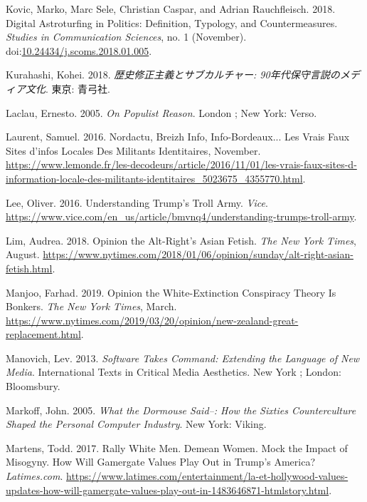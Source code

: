 \documentclass[10pt,british,A4paper,,openany]{memoir}
\begin{document}
\hypertarget{ref-kovic_digital_2018}{}
Kovic, Marko, Marc Sele, Christian Caspar, and Adrian Rauchfleisch.
2018. Digital Astroturfing in Politics: Definition, Typology, and
Countermeasures. \emph{Studies in Communication Sciences}, no. 1
(November).
doi:\href{https://doi.org/10.24434/j.scoms.2018.01.005}{10.24434/j.scoms.2018.01.005}.

\hypertarget{ref-kurahashi_:_2018}{}
Kurahashi, Kohei. 2018. \emph{歴史修正主義とサブカルチャー:
90年代保守言説のメディア文化}. 東京: 青弓社.

\hypertarget{ref-laclau_populist_2005}{}
Laclau, Ernesto. 2005. \emph{On Populist Reason}. London ; New York:
Verso.

\hypertarget{ref-laurent_nordactu_2016}{}
Laurent, Samuel. 2016. Nordactu, Breizh Info, Info-Bordeaux... Les Vrais
Faux Sites d'infos Locales Des Militants Identitaires, November.
\url{https://www.lemonde.fr/les-decodeurs/article/2016/11/01/les-vrais-faux-sites-d-information-locale-des-militants-identitaires_5023675_4355770.html}.

\hypertarget{ref-lee_understanding_2016}{}
Lee, Oliver. 2016. Understanding Trump's Troll Army. \emph{Vice}.
\url{https://www.vice.com/en_us/article/bmvnq4/understanding-trumps-troll-army}.

\hypertarget{ref-lim_opinion_2018}{}
Lim, Audrea. 2018. Opinion the Alt-Right's Asian Fetish. \emph{The New
York Times}, August.
\url{https://www.nytimes.com/2018/01/06/opinion/sunday/alt-right-asian-fetish.html}.

\hypertarget{ref-manjoo_opinion_2019}{}
Manjoo, Farhad. 2019. Opinion the White-Extinction Conspiracy Theory Is
Bonkers. \emph{The New York Times}, March.
\url{https://www.nytimes.com/2019/03/20/opinion/new-zealand-great-replacement.html}.

\hypertarget{ref-manovich_software_2013}{}
Manovich, Lev. 2013. \emph{Software Takes Command: Extending the
Language of New Media}. International Texts in Critical Media
Aesthetics. New York ; London: Bloomsbury.

\hypertarget{ref-markoff_what_2005}{}
Markoff, John. 2005. \emph{What the Dormouse Said--: How the Sixties
Counterculture Shaped the Personal Computer Industry}. New York: Viking.

\hypertarget{ref-martens_rally_2017}{}
Martens, Todd. 2017. Rally White Men. Demean Women. Mock the Impact of
Misogyny. How Will Gamergate Values Play Out in Trump's America?
\emph{Latimes.com}.
\url{https://www.latimes.com/entertainment/la-et-hollywood-values-updates-how-will-gamergate-values-play-out-in-1483646871-htmlstory.html}.
\end{document}
